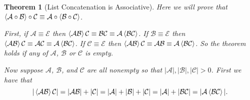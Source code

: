 \documentclass[12pt]{article}
\theoremstyle{break}
\theoremstyle{break}
\newtheorem{theorem}{Theorem}[section]
\theoremstyle{break}
\theoremstyle{break}
\newcommand{\mc}[1]{\mathcal{#1}}
\begin{document}
\begin{theorem}[List Concatenation is Associative]
Here we will prove that $\Braket{\mc{A}\circ \mc{B}}\circ \mc{C} \equiv \mc{A} \circ \Braket{\mc{B} \circ \mc{C}}$.

First, if $\mc{A} \equiv \mc{E}$ then $\Braket{\mc{A}\mc{B}}\mc{C} \equiv \mc{B}\mc{C} \equiv \mc{A}\Braket{\mc{B}\mc{C}}$. 
If $\mc{B}\equiv \mc{E}$ then $\Braket{\mc{A}\mc{B}}\mc{C} \equiv \mc{A}\mc{C} \equiv \mc{A}\Braket{\mc{B}\mc{C}}$. 
If $\mc{C}\equiv \mc{E}$ then $\Braket{\mc{A}\mc{B}}\mc{C} \equiv \mc{A}\mc{B} \equiv \mc{A}\Braket{\mc{B}\mc{C}}$. So the theorem holds if any of $\mc{A}$, $\mc{B}$ or $\mc{C}$ is empty.

Now suppose $\mc{A}$, $\mc{B}$, and $\mc{C}$ are all nonempty so that $|\mc{A}|, |\mc{B}|, |\mc{C}| > 0$.
First we have that
$$
|\Braket{\mc{A}\mc{B}}\mc{C}| = |\mc{A}\mc{B}| + |\mc{C}| = |\mc{A}| + |\mc{B}| + |\mc{C}| = |\mc{A}| + |\mc{B}\mc{C}| = |\mc{A}\Braket{\mc{B}\mc{C}}|.
$$


\end{theorem}
\end{document}
